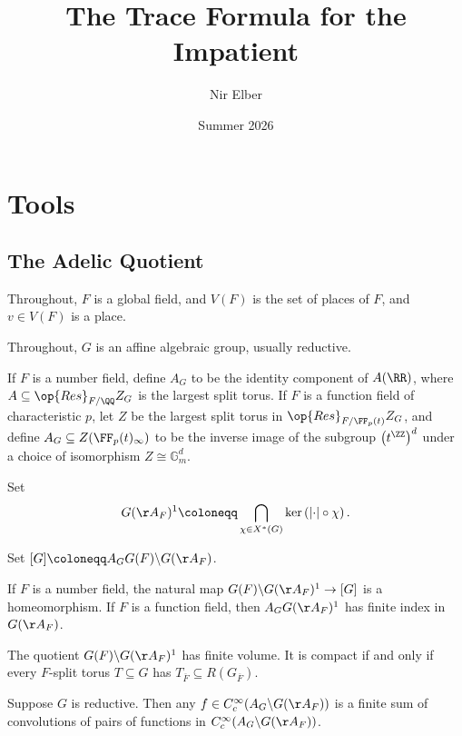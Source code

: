 \documentclass{article}
\title{The Trace Formula for the Impatient}
\author{Nir Elber}
\date{Summer 2026}
\begin{document}
\maketitle


\tableofcontents

\newpage

\section{Tools}

\subsection{The Adelic Quotient}
\begin{notation}
	Throughout, $F$ is a global field, and $V(F)$ is the set of places of $F$, and $v\in V(F)$ is a place.
\end{notation}
\begin{notation}
	Throughout, $G$ is an affine algebraic group, usually reductive.
\end{notation}
\begin{notation}
	If $F$ is a number field, define $A_G$ to be the identity component of $A(\RR)$, where $A\subseteq\op{Res}_{F/\QQ}Z_G$ is the largest split torus. If $F$ is a function field of characteristic $p$, let $Z$ be the largest split torus in $\op{Res}_{F/\FF_p(t)}Z_G$, and define $A_G\subseteq Z(\FF_p(t)_\infty)$ to be the inverse image of the subgroup $\left(t^\ZZ\right)^d$ under a choice of isomorphism $Z\cong\mathbb G_m^d$.
\end{notation}
\begin{notation}
	Set
	\[G(\AA_F)^1\coloneqq\bigcap_{\chi\in X^*(G)}\ker\left(\left|\cdot\right|\circ\chi\right).\]
\end{notation}
\begin{notation}
	Set $[G]\coloneqq A_GG(F)\backslash G(\AA_F)$.
\end{notation}
\begin{proposition}
	If $F$ is a number field, the natural map $G(F)\backslash G(\AA_F)^1\to[G]$ is a homeomorphism. If $F$ is a function field, then $A_GG(\AA_F)^1$ has finite index in $G(\AA_F)$.
\end{proposition}
\begin{theorem}
	The quotient $G(F)\backslash G(\AA_F)^1$ has finite volume. It is compact if and only if every $F$-split torus $T\subseteq G$ has $T_{\overline F}\subseteq R(G_{\overline F})$.
\end{theorem}
\begin{theorem}
	Suppose $G$ is reductive. Then any $f\in C_c^\infty(A_G\backslash G(\AA_F))$ is a finite sum of convolutions of pairs of functions in $C_c^\infty(A_G\backslash G(\AA_F))$.
\end{theorem}
\end{document}
